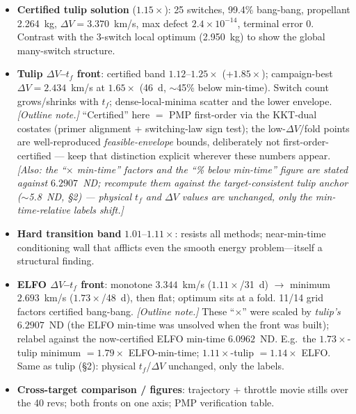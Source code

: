 \documentclass[11pt]{article}
\begin{document}
\begin{itemize}
  \item \textbf{Certified tulip solution} ($1.15\times$): 25 switches, 99.4\%
        bang-bang, propellant 2.264~kg, $\Delta V=3.370$~km/s, max defect
        $2.4\times10^{-14}$, terminal error 0. Contrast with the 3-switch local
        optimum (2.950~kg) to show the global many-switch structure.
  \item \textbf{Tulip $\Delta V$--$t_f$ front}: certified band $1.12$--$1.25\times$
        (+$1.85\times$); campaign-best $\Delta V=2.434$~km/s at $1.65\times$
        (46~d, $\sim$45\% below min-time). Switch count grows/shrinks with
        $t_f$; dense-local-minima scatter and the lower envelope.
        \emph{[Outline note.]} ``Certified'' here $=$ PMP first-order via the
        KKT-dual costates (primer alignment + switching-law sign test); the
        low-$\Delta V$/fold points are well-reproduced \emph{feasible-envelope}
        bounds, deliberately not first-order-certified --- keep that distinction
        explicit wherever these numbers appear. \emph{[Also: the ``$\times$
        min-time'' factors and the ``\% below min-time'' figure are stated
        against $6.2907$~ND; recompute them against the target-consistent tulip
        anchor ($\sim$5.8~ND, \S2) --- physical $t_f$ and $\Delta V$ values are
        unchanged, only the min-time-relative labels shift.]}
  \item \textbf{Hard transition band} $1.01$--$1.11\times$: resists all methods;
        near-min-time conditioning wall that afflicts even the smooth energy
        problem---itself a structural finding.
  \item \textbf{ELFO $\Delta V$--$t_f$ front}: monotone $3.344$~km/s
        ($1.11\times$/31~d) $\to$ minimum $2.693$~km/s ($1.73\times$/48~d), then
        flat; optimum sits at a fold. 11/14 grid factors certified bang-bang.
        \emph{[Outline note.]} These ``$\times$'' were scaled by \emph{tulip's}
        $6.2907$~ND (the ELFO min-time was unsolved when the front was built);
        relabel against the now-certified ELFO min-time $6.0962$~ND. E.g.\ the
        $1.73\times$-tulip minimum $=1.79\times$ ELFO-min-time; $1.11\times$-tulip
        $=1.14\times$ ELFO. Same as tulip (\S2): physical $t_f$/$\Delta V$
        unchanged, only the labels.
  \item \textbf{Cross-target comparison / figures}: trajectory + throttle movie
        stills over the 40 revs; both fronts on one axis; PMP verification table.
\end{itemize}
\end{document}
